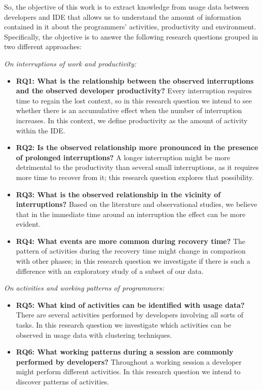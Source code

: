 So, the objective of this work is to extract knowledge from usage data between developers and IDE that allows us to understand the amount of information contained in it about the programmers' activities, productivity and environment. Specifically, the objective is to answer the following research questions grouped in two different approaches: 

\begin{changedforreviewerlong}

\emph{On interruptions of work and productivity:}
\begin{itemize}
	\item \textbf{RQ1: What is the relationship between the observed interruptions and the observed developer productivity?} Every interruption requires time to regain the lost context, so in this research question we intend to see whether there is an accumulative effect when the number of interruption increases. In this context, we define productivity as the amount of activity within the IDE. 
	\item \textbf{RQ2: Is the observed relationship more pronounced in the presence of prolonged interruptions?} A longer interruption might be more detrimental to the productivity than several small interruptions, as it requires more time to recover from it; this research question explores that possibility.
	\item \textbf{RQ3: What is the observed relationship in the vicinity of interruptions?} Based on the literature and observational studies, we believe that in the immediate time around an interruption the effect can be more evident.
	\item \textbf{RQ4: What events are more common during recovery time?} The pattern of activities during the recovery time might change in comparison with other phases; in this research question we investigate if there is such a difference with an exploratory study of a subset of our data. 
\end{itemize}

\emph{On activities and working patterns of programmers:}
\begin{itemize}
	\item \textbf{RQ5: What kind of activities can be identified with usage data?} There are several activities performed by developers involving all sorts of tasks. In this research question we investigate which activities can be observed in usage data with clustering techniques.
	\item \textbf{RQ6: What working patterns during a session are commonly performed by developers?} Throughout a	 working session a developer might perform different activities. In this research question we intend to discover patterns of activities.
\end{itemize}


\end{changedforreviewerlong}
